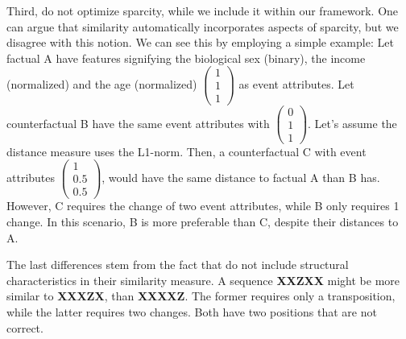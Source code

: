 \documentclass[./../../paper.tex]{subfiles}
\begin{document}
Third, \autocite{hsieh_DiCE4ELInterpretingProcess_2021} do not optimize sparcity, while we include it within our framework. One can argue that similarity automatically incorporates aspects of sparcity, but we disagree with this notion. We can see this by employing a simple example:  Let factual A have features signifying the biological sex (binary), the income (normalized) and the age (normalized) $\begin{pmatrix}1\\1\\1\end{pmatrix}$ as event attributes. Let counterfactual B have the same event attributes with $\begin{pmatrix}0\\1\\1\end{pmatrix}$. Let's assume the distance measure uses the L1-norm. Then, a counterfactual C with event attributes $\begin{pmatrix}1\\0.5\\0.5\end{pmatrix}$, would have the same distance to factual A than B has. However, C requires the change of two event attributes, while B only requires 1 change. In this scenario, B is more preferable than C, despite their distances to A.

The last differences stem from the fact that \citeauthor{hsieh_DiCE4ELInterpretingProcess_2021} do not include structural characteristics in their similarity measure. A sequence \textbf{XXZXX} might be more similar to \textbf{XXXZX}, than \textbf{XXXXZ}. The former requires only a transposition, while the latter requires two changes. Both have two positions that are not correct.  
\end{document}
